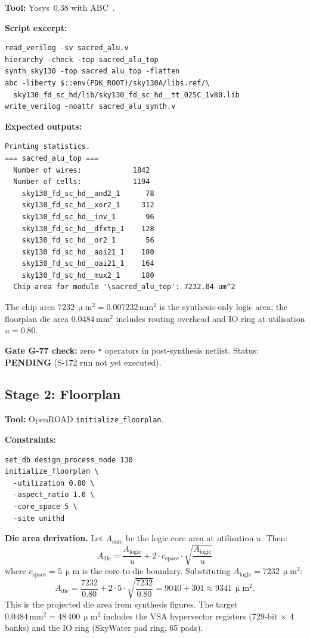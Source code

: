 \textbf{Tool:} Yosys~0.38 with ABC~\cite{edwards2022sky130}.

\textbf{Script excerpt:}

\begin{verbatim}
read_verilog -sv sacred_alu.v
hierarchy -check -top sacred_alu_top
synth_sky130 -top sacred_alu_top -flatten
abc -liberty $::env(PDK_ROOT)/sky130A/libs.ref/\
  sky130_fd_sc_hd/lib/sky130_fd_sc_hd__tt_025C_1v80.lib
write_verilog -noattr sacred_alu_synth.v
\end{verbatim}

\textbf{Expected outputs:}

\begin{verbatim}
Printing statistics.
=== sacred_alu_top ===
  Number of wires:            1842
  Number of cells:            1194
    sky130_fd_sc_hd__and2_1      78
    sky130_fd_sc_hd__xor2_1     312
    sky130_fd_sc_hd__inv_1       96
    sky130_fd_sc_hd__dfxtp_1    128
    sky130_fd_sc_hd__or2_1       56
    sky130_fd_sc_hd__aoi21_1    180
    sky130_fd_sc_hd__oai21_1    164
    sky130_fd_sc_hd__mux2_1     180
  Chip area for module '\sacred_alu_top': 7232.04 um^2
\end{verbatim}

The chip area $7232\,\upmu\mathrm{m}^2 = 0.007232\,\mathrm{mm}^2$
is the synthesis-only logic area; the floorplan die area
$0.0484\,\mathrm{mm}^2$ includes routing overhead and IO ring at
utilisation $u = 0.80$.

\textbf{Gate G-77 check:} zero \texttt{*} operators in post-synthesis netlist.
Status: \textbf{PENDING} (S-172 run not yet executed).

\subsection{Stage 2: Floorplan}
\label{subsec:72:stage2-floorplan}

\textbf{Tool:} OpenROAD \texttt{initialize\_floorplan}.

\textbf{Constraints:}

\begin{verbatim}
set_db design_process_node 130
initialize_floorplan \
  -utilization 0.80 \
  -aspect_ratio 1.0 \
  -core_space 5 \
  -site unithd
\end{verbatim}

\textbf{Die area derivation.}
Let $A_{\text{core}}$ be the logic core area at utilisation $u$.
Then:
\[
  A_{\text{die}} = \frac{A_{\text{logic}}}{u}
    + 2 \cdot c_{\text{space}} \cdot \sqrt{\frac{A_{\text{logic}}}{u}}
\]
where $c_{\text{space}} = 5\,\upmu\mathrm{m}$ is the core-to-die boundary.
Substituting $A_{\text{logic}} = 7232\,\upmu\mathrm{m}^2$:
\[
  A_{\text{die}} = \frac{7232}{0.80} + 2 \cdot 5 \cdot
    \sqrt{\frac{7232}{0.80}}
  = 9040 + 301 \approx 9341\,\upmu\mathrm{m}^2.
\]
This is the projected die area from synthesis figures.
The target $0.0484\,\mathrm{mm}^2 = 48\,400\,\upmu\mathrm{m}^2$ includes
the VSA hypervector registers (729-bit $\times$ 4 banks)
and the IO ring (SkyWater pad ring, 65 pads).

